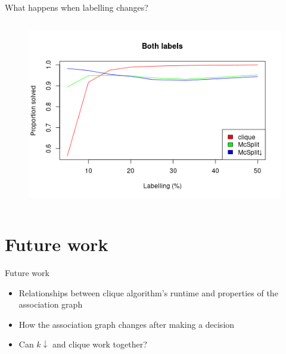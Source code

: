 \documentclass{beamer}
\begin{document}
\begin{frame}{What happens when labelling changes?}
\begin{columns}
\begin{column}{0.5\textwidth}
      \begin{figure}
        \centering
        \includegraphics[width=\textwidth]{../dissertation/images/both_labels_linechart.png}
      \end{figure}
    \end{column}
  \end{columns}
\end{frame}

\section{Future work}
\begin{frame}{Future work}
  \begin{itemize}
  \item Relationships between clique algorithm's runtime and properties of the
    association graph
  \item How the association graph changes after making a decision
  \item Can $k\downarrow$ and clique work together?
  \end{itemize}
\end{frame}
\end{document}
